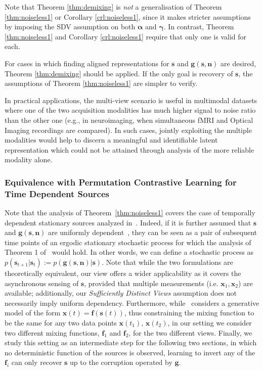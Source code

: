 \documentclass[letterpaper]{article}
\theoremstyle{definition}
\begin{document}
Note that Theorem \ref{thm:demixing} is \emph{not} a generalisation of Theorem \ref{thm:noiseless1} or Corollary \ref{crl:noiseless1}, since it makes stricter assumptions by imposing the SDV assumption on both $\bm{\alpha}$ and $\bm{\gamma}$.
In contrast, Theorem \ref{thm:noiseless1} and Corollary \ref{crl:noiseless1} require that only one is valid for each.

For cases in which finding aligned representations for $\bm{s}$ and $\bm{g}(\bm{s}, \bm{n})$ are desired, Theorem \ref{thm:demixing} should be applied.
If the only goal is recovery of $\bm{s}$, the assumptions of Theorem \ref{thm:noiseless1} are simpler to verify.


In practical applications, the multi-view scenario is useful in multimodal datasets where one of the two acquisition modalities has much higher signal to noise ratio than the other one (e.g., in neuroimaging, when simultaneous fMRI and Optical Imaging recordings are compared). In such cases, jointly exploiting the multiple modalities would help to discern a meaningful and identifiable latent representation which could not be attained through analysis of the more reliable modality alone.


\subsubsection{Equivalence with Permutation Contrastive Learning for Time Dependent Sources}
Note that the analysis of Theorem~\ref{thm:noiseless1} covers the case of temporally dependent stationary sources analyzed in~\cite{pmlr-v54-hyvarinen17a}.
Indeed, if it is further assumed that $\bm{s}$ and $\bm{g}(\bm{s}, \bm{n})$ are uniformly dependent~\cite{pmlr-v54-hyvarinen17a}, they can be seen as a pair of subsequent time points of an ergodic stationary stochastic process for which the analysis of Theorem 1 of~\cite{pmlr-v54-hyvarinen17a} would hold. In other words, we can define a stochastic process as $p(\bm{s}_{t+1}| \bm{s}_t) := p(\bm{g}(\bm{s}, \bm{n})| \bm{s})$.
Note that while the two formulations are theoretically equivalent, our view offers a wider applicability as it covers the asynchronous sensing of $\bm{s}$, provided that multiple measurements (i.e. $\bm{x}_1, \bm{x}_2$) are available; additionally, our \textit{Sufficiently Distinct Views} assumption does not necessarily imply uniform dependency. Furthermore, while~\cite{pmlr-v54-hyvarinen17a} considers a generative model of the form $\bm{x}(t) = \bm{f}(\bm{s}(t))$, thus constraining the mixing function to be the same for any two data points $\bm{x}(t_1)$, $\bm{x}(t_2)$, in our setting we consider two different mixing functions, $\bm{f}_1$ and $\bm{f}_2$, for the two different views.
Finally, we study this setting as an intermediate step for the following two sections, in which no deterministic function of the sources is observed, learning to invert any of the $\bm{f}_i$ can only recover $\bm{s}$ up to the corruption operated by $\bm{g}$.
\end{document}
